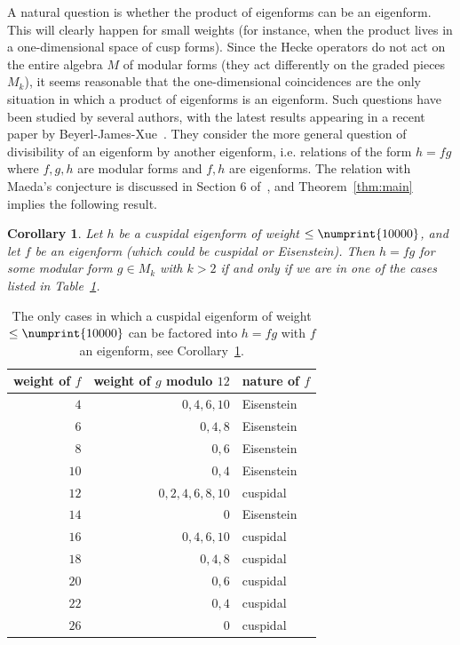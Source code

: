 \documentclass[11pt]{article}
\theoremstyle{plain}
\newtheorem{corollary}[theorem]{Corollary}
\theoremstyle{definition}
\theoremstyle{remark}
\numberwithin{equation}{section}
\newcommand{\bound}{\numprint{10000}}
\begin{document}
A natural question is whether the product of eigenforms can be an eigenform.
This will clearly happen for small weights (for instance, when the product
lives in a one-dimensional space of cusp forms).  Since the Hecke operators
do not act on the entire algebra $M$ of modular forms (they act
differently on the graded pieces $M_k$), it seems reasonable that the
one-dimensional coincidences are the only situation in which a product of
eigenforms is an eigenform.  Such questions have been studied by several
authors, with the latest results appearing in a recent paper by
Beyerl-James-Xue~\cite{BeyerlJamesXue}.  They consider the more general question
of divisibility of an
eigenform by another eigenform, i.e. relations of the form $h=fg$ where
$f,g,h$ are modular forms and $f,h$ are eigenforms.  The relation with Maeda's 
conjecture is discussed in Section 6 of~\cite{BeyerlJamesXue}, and 
Theorem~\ref{thm:main} implies the following result.

\begin{corollary}
  \label{cor:div_eigen}
  Let $h$ be a cuspidal eigenform of weight $\leq\bound$, and let 
  $f$ be an eigenform
  (which could be cuspidal or Eisenstein).  Then $h=fg$ for some modular form
  $g\in M_k$ with $k>2$ if and only if we are in one of the cases listed in 
  Table~\ref{tbl:div_eigen}.
\end{corollary}

\begin{table}[h]
  \begin{center}
  \begin{tabular}{r|r|l}
    weight of $f$ & weight of $g$ modulo $12$ & nature of $f$ \\ \hline
    $4$ & $0,4,6,10$ & Eisenstein \\
    $6$ & $0,4,8$ & Eisenstein \\
    $8$ & $0,6$ & Eisenstein \\
    $10$ & $0,4$ & Eisenstein \\
    $12$ & $0,2,4,6,8,10$ & cuspidal\\
    $14$ & $0$ & Eisenstein \\
    $16$ & $0,4,6,10$ & cuspidal\\
    $18$ & $0,4,8$ & cuspidal\\
    $20$ & $0,6$ & cuspidal\\
    $22$ & $0,4$ & cuspidal\\
    $26$ & $0$ & cuspidal
  \end{tabular}
\end{center}
  \caption{The only cases in which a cuspidal eigenform of weight $\leq\bound$
  can be factored into $h=fg$ with $f$ an eigenform, see
  Corollary~\ref{cor:div_eigen}.}
  \label{tbl:div_eigen}
\end{table}
\end{document}
